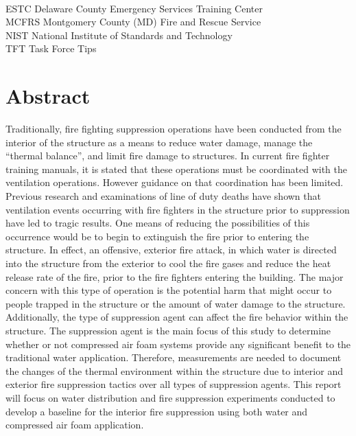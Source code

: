 \documentclass[12pt,oneside]{book}
\begin{document}
\begin{tabbing}
\hspace{1.5in} \= \\
ESTC \> Delaware County Emergency Services Training Center \\
MCFRS \> Montgomery County (MD) Fire and Rescue Service \\
NIST \> National Institute of Standards and Technology \\
TFT \> Task Force Tips \\
\end{tabbing}
	
\mainmatter
	
\chapter*{\centering Abstract}
Traditionally, fire fighting suppression operations have been conducted from the interior of the structure as a means to reduce water damage, manage the ``thermal balance'', and limit fire damage to structures. In current fire fighter training manuals, it is stated that these operations must be coordinated with the ventilation operations. However guidance on that coordination has been limited. Previous research and examinations of line of duty deaths have shown that ventilation events occurring with fire fighters in the structure prior to suppression have led to tragic results. One means of reducing the possibilities of this occurrence would be to begin to extinguish the fire prior to entering the structure. In effect, an offensive, exterior fire attack, in which water is directed into the structure from the exterior to cool the fire gases and reduce the heat release rate of the fire, prior to the fire fighters entering the building. The major concern with this type of operation is the potential harm that might occur to people trapped in the structure or the amount of water damage to the structure. Additionally, the type of suppression agent can affect the fire behavior within the structure. The suppression agent is the main focus of this study to determine whether or not compressed air foam systems provide any significant benefit to the traditional water application. Therefore, measurements are needed to document the changes of the thermal environment within the structure due to interior and exterior fire suppression tactics over all types of suppression agents. This report will focus on water distribution and fire suppression experiments conducted to develop a baseline for the interior fire suppression using both water and compressed air foam application.
\end{document}
